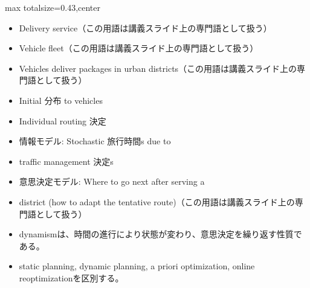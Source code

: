 \clearpage
{}
\begin{minipage}[t]{0.405\textwidth}
\begin{adjustbox}{max totalsize={\textwidth}{0.43\textheight},center}
\begin{minipage}{\textwidth}\scriptsize
{}\begin{itemize}
\item Delivery service（この用語は講義スライド上の専門語として扱う）
\item Vehicle fleet（この用語は講義スライド上の専門語として扱う）
\item Vehicles deliver packages in urban districts（この用語は講義スライド上の専門語として扱う）
\item Initial 分布 to vehicles
\item Individual routing 決定
\item 情報モデル: Stochastic 旅行時間s due to
\item traffic management 決定s
\item 意思決定モデル: Where to go next after serving a
\item district (how to adapt the tentative route)（この用語は講義スライド上の専門語として扱う）
\end{itemize}\begin{itemize}
\item dynamismは、時間の進行により状態が変わり、意思決定を繰り返す性質である。
\item static planning, dynamic planning, a priori optimization, online reoptimizationを区別する。
\end{itemize}
\end{minipage}
\end{adjustbox}
\end{minipage}\hfill
